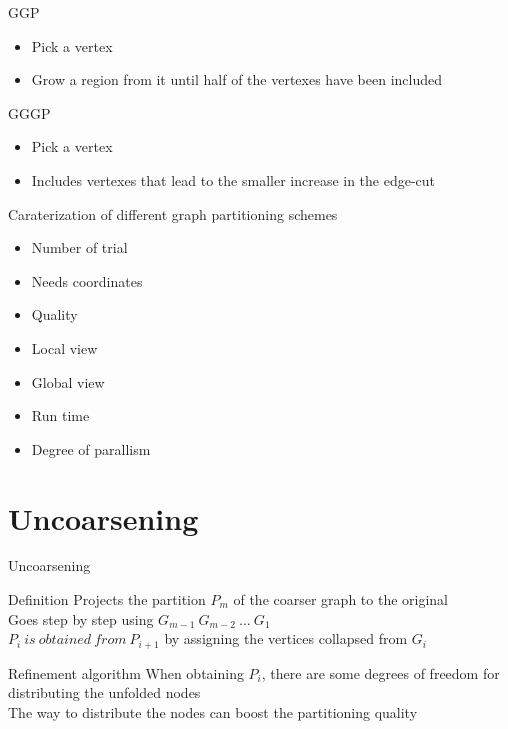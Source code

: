 \documentclass{beamer}
\begin{document}
	\begin{frame}{GGP}
		\begin{itemize}
			\item Pick a vertex
			\item Grow a region from it until half of the vertexes have been included
		\end{itemize}
	\end{frame}
	\begin{frame}{GGGP}
		\begin{itemize}
			\item Pick a vertex
			\item Includes vertexes that lead
			to the smaller increase in the edge-cut
		\end{itemize}
	\end{frame}
	
	
	\begin{frame}{Caraterization of different graph partitioning schemes}
		\begin{itemize}
			\item Number of trial
			\item Needs coordinates
			\item Quality
			\item Local view
			\item Global view
			\item Run time
			\item Degree of parallism
		\end{itemize}
	\end{frame}
	\author[G.~Perez Bada]{Q.~Diaferia \and T.~Levasseur \and W.~Pei \and G.~Perez Bada}
	\section{Uncoarsening}
	\begin{frame}{Uncoarsening}
		\begin{block}{Definition}
			Projects the partition \(P_{m}\) of the coarser graph to the original \\
			Goes step by step using \(G_{m-1}~G_{m-2}~...~G_1\) \\
			\(P_i~is~obtained~from~P_{i+1}\) by assigning the vertices collapsed from \(G_i\)\\
		\end{block}
		\begin{block}{Refinement algorithm}
			When obtaining \(P_i\), there are some degrees of freedom for distributing the unfolded nodes\\
			The way to distribute the nodes can boost the partitioning quality
		\end{block}
	\end{frame}
	
\end{document}

